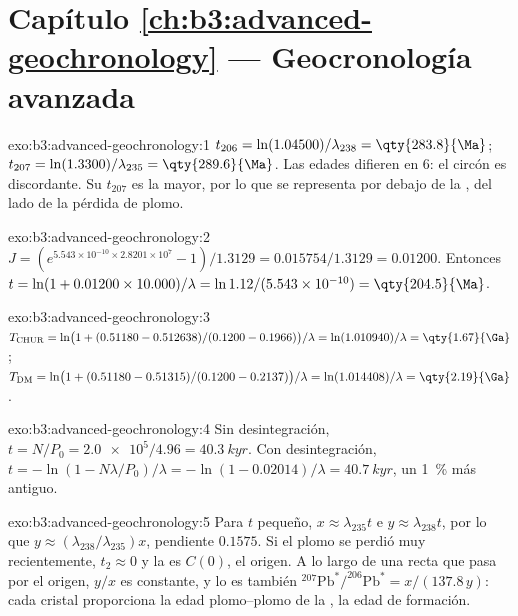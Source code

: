\section*{Capítulo \ref{ch:b3:advanced-geochronology} --- Geocronología avanzada}

\begin{solution}{exo:b3:advanced-geochronology:1}
$t_{206} = \ln(1.04500)/\lambda_{238} = \qty{283.8}{\Ma}$; $t_{207} =
\ln(1.3300)/\lambda_{235} = \qty{289.6}{\Ma}$. Las edades difieren en
\qty{6}{\Ma}: el circón es discordante. Su $t_{207}$ es la mayor, por lo que se representa
por debajo de la , del lado de la pérdida de plomo.
\end{solution}

\begin{solution}{exo:b3:advanced-geochronology:2}
$J = (e^{5.543\times10^{-10}\times2.8201\times10^7} - 1)/1.3129 =
0.015754/1.3129 = 0.01200$. Entonces $t = \ln(1 + 0.01200\times10.000)/\lambda =
\ln 1.12/(5.543\times10^{-10}) = \qty{204.5}{\Ma}$.
\end{solution}

\begin{solution}{exo:b3:advanced-geochronology:3}
$T_{\mathrm{CHUR}} = \ln\bigl(1 + (0.51180 - 0.512638)/(0.1200 -
0.1966)\bigr)/\lambda = \ln(1.010940)/\lambda = \qty{1.67}{\Ga}$;
$T_{\mathrm{DM}} = \ln\bigl(1 + (0.51180 - 0.51315)/(0.1200 - 0.2137)\bigr)/\lambda
= \ln(1.014408)/\lambda = \qty{2.19}{\Ga}$.
\end{solution}

\begin{solution}{exo:b3:advanced-geochronology:4}
Sin desintegración, $t = N/P_0 = \num{2.0e5}/4.96 = \qty{40.3}{kyr}$. Con desintegración,
$t = -\ln(1 - N\lambda/P_0)/\lambda = -\ln(1 - 0.02014)/\lambda =
\qty{40.7}{kyr}$, un \qty{1}{\percent} más antiguo.
\end{solution}

\begin{solution}{exo:b3:advanced-geochronology:5}
Para $t$ pequeño, $x \approx \lambda_{235}t$ e $y \approx \lambda_{238}t$, por lo que
$y \approx (\lambda_{238}/\lambda_{235})x$, pendiente $0.1575$. Si el plomo se
perdió muy recientemente, $t_2 \approx 0$ y la  es $C(0)$, el
origen. A lo largo de una recta que pasa por el origen, $y/x$ es constante, y lo es también
$^{207}\mathrm{Pb}^*/^{206}\mathrm{Pb}^* = x/(137.8\,y)$: cada cristal proporciona
la edad plomo--plomo de la , la edad de formación.
\end{solution}

